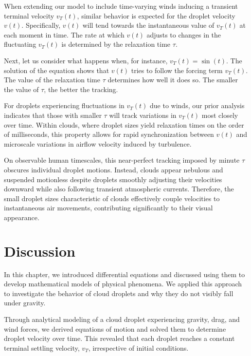 When extending our model to include time-varying winds inducing a transient terminal velocity $v_T(t)$, similar behavior is expected for the droplet velocity $v(t)$. Specifically, $v(t)$ will tend towards the instantaneous value of $v_T(t)$ at each moment in time. The rate at which $v(t)$ adjusts to changes in the fluctuating $v_T(t)$ is determined by the relaxation time $\tau$.

Next, let us consider what happens when, for instance, $v_T(t) = \sin(t)$. The solution of the equation shows that $v(t)$ tries to follow the forcing term $v_T(t)$. The value of the relaxation time $\tau$ determines how well it does so. The smaller the value of $\tau$, the better the tracking.

For droplets experiencing fluctuations in $v_T(t)$ due to winds, our prior analysis indicates that those with smaller $\tau$ will track variations in $v_T(t)$ most closely over time. Within clouds, where droplet sizes yield relaxation times on the order of milliseconds, this property allows for rapid synchronization between $v(t)$ and microscale variations in airflow velocity induced by turbulence.

On observable human timescales, this near-perfect tracking imposed by minute $\tau$ obscures individual droplet motions. Instead, clouds appear nebulous and suspended motionless despite droplets smoothly adjusting their velocities downward while also following transient atmospheric currents. Therefore, the small droplet sizes characteristic of clouds effectively couple velocities to instantaneous air movements, contributing significantly to their visual appearance.

\section{Discussion}

In this chapter, we introduced differential equations and discussed using them to develop mathematical models of physical phenomena. We applied this approach to investigate the behavior of cloud droplets and why they do not visibly fall under gravity.

Through analytical modeling of a cloud droplet experiencing gravity, drag, and wind forces, we derived equations of motion and solved them to determine droplet velocity over time. This revealed that each droplet reaches a constant terminal settling velocity, $v_T$, irrespective of initial conditions.


